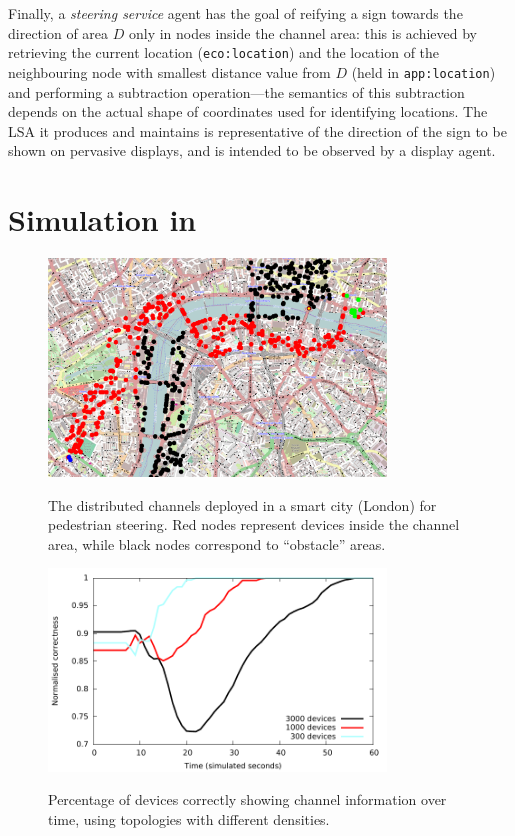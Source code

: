\documentclass[12pt,a4paper,twoside,openright]{book}
\begin{document}
Finally, a \emph{steering service} agent has the goal of reifying a sign towards the direction of area $D$ only in nodes inside the channel area: this is achieved by retrieving the current location (\texttt{eco:location}) and the location  of the neighbouring node with smallest distance value from $D$ (held in \texttt{app:location}) and performing a subtraction operation---the semantics of this subtraction depends on the actual shape of coordinates used for identifying locations.
%
The LSA it produces and maintains is representative of the direction of the sign to be shown on pervasive displays, and is intended to be observed by a display agent.

\section{Simulation in \alchemist{}}
\label{simulation-channel}

\begin{figure}
\begin{center}{\includegraphics[width=0.8\textwidth]{img/london-channel}}\end{center}
\caption[Channel deployed in London]{The distributed channels deployed in a smart city (London) for pedestrian steering. Red nodes represent devices inside the channel area, while black nodes correspond to ``obstacle'' areas.}
\label{f:london}
\end{figure}

\begin{figure}
\begin{center}{\includegraphics[width=0.8\textwidth]{img/quality}}\end{center}
\caption[Devices correctly building the channel]{Percentage of devices correctly showing channel information over time, using topologies with different densities.}
\label{f:london2}
\end{figure}
\end{document}
